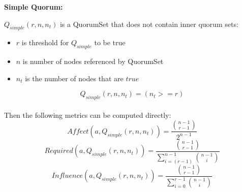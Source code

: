 \newcommand{\powerset}[1]{\mathbb{P}(#1)}

\newcommand{\effectedExpression}[0]{ \sum_{N_t \in P} Q(\{1\},N_t) \land \lnot Q(\{\},N_t) }
\newcommand{\affectDenomExpression}[0]{ 2^{n-1} }
\newcommand{\requireDenomExpression}[0]{ \sum_{N_t \in P} Q(\{a\},N_t) }
\newcommand{\influenceDenomExpression}[0]{ \sum_{N_t \in P} \lnot Q(\{\},N_t) }

\newcommand{\effectedCombinationsExpression}[0]{ \binom{n-1}{r-1} }




\textbf{Simple Quorum:}\\\par
$Q_{simple}(r,n,n_t)$ is a QuorumSet that does not contain inner quorum sets:
\begin{itemize}
  \item $r$ is threshold for $Q_{simple}$ to be true
  \item $n$ is number of nodes referenced by QuorumSet
  \item $n_t$ is the number of nodes that are $true$
\end{itemize}
\begin{equation}
    Q_{simple}(r,n,n_t) = (n_t>=r)
\end{equation}
\\

Then the following metrics can be computed directly:
\begin{equation}
	Affect(a,Q_{simple}(r,n,n_t)) = \frac{ \effectedCombinationsExpression{} }{ \affectDenomExpression{} }
\end{equation}
\begin{equation}
	Required(a,Q_{simple}(r,n,n_t)) = \frac{ \effectedCombinationsExpression{} }{ \sum_{i=(r-1)}^{n-1} \binom{n-1}{i} }
\end{equation}
\begin{equation}
	Influence(a,Q_{simple}(r,n,n_t)) = \frac{ \effectedCombinationsExpression{} }{ \sum_{i=0}^{r-1} \binom{n-1}{i} }
\end{equation}
